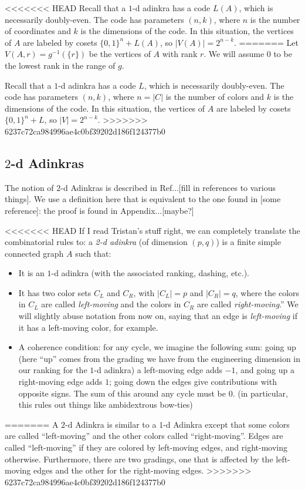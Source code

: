\documentclass[12pt,twoside,singlespace]{article}
\numberwithin{equation}{section}
\theoremstyle{definition}
\begin{document}
<<<<<<< HEAD
Recall that a $1$-d adinkra has a code $L(A)$, which is necessarily doubly-even. The code has parameters $(n,k)$, where $n$ is the number of coordinates and $k$ is the dimensions of the code. In this situation, the vertices of $A$ are labeled by cosets $\{0,1\}^n + L(A)$, so $|V(A)| = 2^{n-k}$.
=======
Let $V(A, r)=g^{-1}(\{r\})$ be the vertices of $A$ with rank $r$.  We will assume $0$ to be the lowest rank in the range of $g$.

Recall that a $1$-d adinkra has a code $L$, which is necessarily doubly-even. The code has parameters $(n,k)$, where $n=|C|$ is the number of colors and $k$ is the dimensions of the code. In this situation, the vertices of $A$ are labeled by cosets $\{0,1\}^n + L$, so $|V| = 2^{n-k}$.
>>>>>>> 6237c72ca984996ae4c0bf39202d186f124377b0

\subsection{$2$-d Adinkras}
The notion of $2$-d Adinkras is described in Ref...[fill in references to various things].  We use a definition here that is equivalent to the one found in [some reference]: the proof is found in Appendix...[maybe?]

<<<<<<< HEAD
If I read Tristan's stuff right, we can completely translate the combinatorial rules to: a \emph{2-d adinkra} (of dimension $(p,q)$) is a finite simple connected graph $A$ such that:
\begin{itemize}
\item It is an $1$-d adinkra (with the associated ranking, dashing, etc.).
\item It has two color sets $C_L$ and $C_R$, with $|C_L| = p$ and $|C_R| = q$, where the colors in $C_L$ are called \emph{left-moving} and the colors in $C_R$ are called \emph{right-moving}.'' We will slightly abuse notation from now on, saying that an edge is \emph{left-moving} if it has a left-moving color, for example.
\item A coherence condition: for any cycle, we imagine the following sum: going up (here ``up'' comes from the grading we have from the engineering dimension in our ranking for the $1$-d adinkra) a left-moving edge adds $-1$, and going up a right-moving edge adds $1$; going down the edges give contributions with opposite signs. The sum of this around any cycle must be $0$. (in particular, this rules out things like ambidextrous bow-ties)
\end{itemize} 
=======
A $2$-d Adinkra is similar to a $1$-d Adinkra except that some colors are called ``left-moving'' and the other colors called ``right-moving''.  Edges are called ``left-moving'' if they are colored by left-moving edges, and right-moving otherwise.  Furthermore, there are two gradings, one that is affected by the left-moving edges and the other for the right-moving edges.
>>>>>>> 6237c72ca984996ae4c0bf39202d186f124377b0
\end{document}
